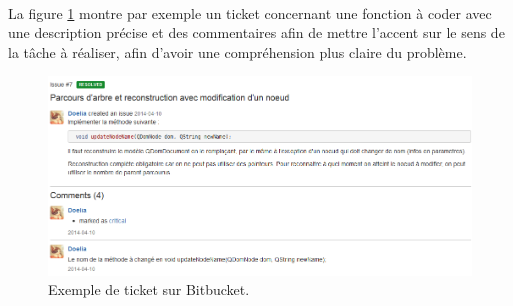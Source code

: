 \paragraph{}
La figure \ref{ticket_Bitbucket} montre par exemple un ticket concernant une fonction à coder avec une description précise et des commentaires afin de mettre l'accent sur le sens de la tâche à réaliser, afin d'avoir une compréhension plus claire du problème.
       
\begin{figure}[!h]
      \centering
      \includegraphics[scale=0.5]{images/bitbucket-exemple-issue.png}
      \caption[Exemple de ticket sur Bitbucket]{Exemple de ticket sur Bitbucket.}
      \label{ticket_Bitbucket}
\end{figure}


